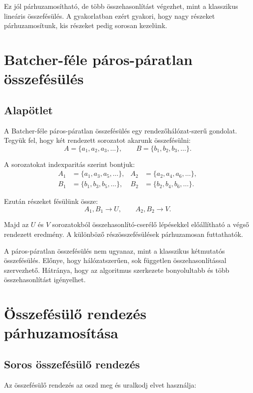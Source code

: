 Ez jól párhuzamosítható, de több összehasonlítást végezhet, mint a klasszikus lineáris összefésülés. A gyakorlatban ezért gyakori, hogy nagy részeket párhuzamosítunk, kis részeket pedig sorosan kezelünk.

\section{Batcher-féle páros-páratlan összefésülés}

\subsection{Alapötlet}

A Batcher-féle páros-páratlan összefésülés egy rendezőhálózat-szerű gondolat. Tegyük fel, hogy két rendezett sorozatot akarunk összefésülni:
\[
  A=\{a_1,a_2,a_3,\ldots\},\qquad
  B=\{b_1,b_2,b_3,\ldots\}.
\]

A sorozatokat indexparitás szerint bontjuk:
\[
\begin{aligned}
  A_1&=\{a_1,a_3,a_5,\ldots\}, & A_2&=\{a_2,a_4,a_6,\ldots\},\\
  B_1&=\{b_1,b_3,b_5,\ldots\}, & B_2&=\{b_2,b_4,b_6,\ldots\}.
\end{aligned}
\]

Ezután részeket fésülünk össze:
\[
  A_1,B_1 \rightarrow U,\qquad A_2,B_2 \rightarrow V.
\]

Majd az $U$ és $V$ sorozatokból összehasonlító-cserélő lépésekkel előállítható a végső rendezett eredmény. A különböző részösszefésülések párhuzamosan futtathatók.

\begin{warningbox}
A páros-páratlan összefésülés nem ugyanaz, mint a klasszikus kétmutatós összefésülés. Előnye, hogy hálózatszerűen, sok független összehasonlítással szervezhető. Hátránya, hogy az algoritmus szerkezete bonyolultabb és több összehasonlítást igényelhet.
\end{warningbox}

\section{Összefésülő rendezés párhuzamosítása}

\subsection{Soros összefésülő rendezés}

Az összefésülő rendezés az oszd meg és uralkodj elvet használja:

